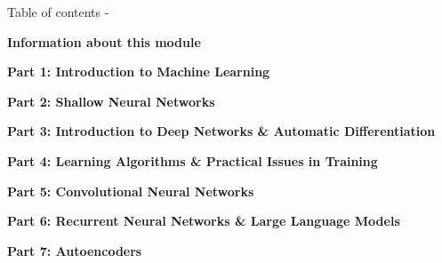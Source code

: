 %
%

\begin{frame}[allowframebreaks,t]{Table of contents -}

\setcounter{section}{-1}
\setcounter{tocdepth}{3}
\setcounter{secnumdepth}{2}

\linespread{1.1}

{\bf Information about this module}\\
\vspace{0.2cm}
\tableofcontents[part=0]

\vspace{0.2cm}

{\bf Part 1: Introduction to Machine Learning}\\
\vspace{0.2cm}
\tableofcontents[part=1]

\vspace{0.2cm}

{\bf Part 2: Shallow Neural Networks}\\
\vspace{0.2cm}
\tableofcontents[part=2]

\vspace{0.2cm}

{\bf Part 3: Introduction to Deep Networks \& Automatic Differentiation}\\
\vspace{0.2cm}
\tableofcontents[part=3]

\vspace{0.2cm}

{\bf Part 4: Learning Algorithms \& Practical Issues in Training}\\
\vspace{0.2cm}
\tableofcontents[part=4]

\vspace{0.2cm}

{\bf Part 5: Convolutional Neural Networks}\\
\vspace{0.2cm}
\tableofcontents[part=5]

\vspace{0.2cm}

{\bf Part 6: Recurrent Neural Networks \& Large Language Models}\\
\vspace{0.2cm}
\tableofcontents[part=6]

\vspace{0.2cm}

{\bf Part 7: Autoencoders}\\
\vspace{0.2cm}
\tableofcontents[part=7]


\end{frame}
